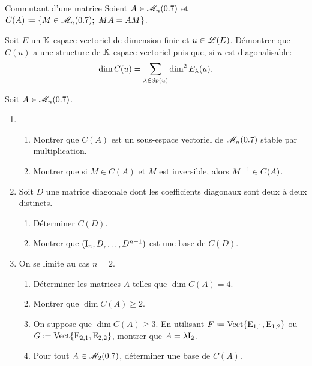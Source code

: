 \begin{defi}{Commutant d'une matrice}
    Soient $A \in \mathscr{M}_n(0.7)$ et $C(A) \defeq \{ M \in \M_n(\R);\ MA = AM \}$.
\end{defi}

\begin{exercice}
    Soit $E$ un $\mathbb{K}$-espace vectoriel de dimension finie et $u \in \mathscr{L}(E)$. Démontrer que $C(u)$ a une structure de $\mathbb{K}$-espace vectoriel puis que, si $u$ est diagonalisable:
    $$\dim C(u) = \sum_{\lambda \in \mathrm{Sp}(u)} \dim^2 E_\lambda(u).$$
\end{exercice}

\begin{solution}
    
\end{solution}

\begin{exercice}
    Soit $A \in \mathscr{M}_n(0.7)$.
    \begin{enumerate}
        \item 
        \begin{enumerate}
            \item Montrer que $C(A)$ est un sous-espace vectoriel de $\mathscr{M}_n(0.7)$ stable par multiplication.
            \item Montrer que si $M \in C(A)$ et $M$ est inversible, alors $M^{-1} \in C(A)$.
        \end{enumerate}
        \item Soit $D$ une matrice diagonale dont les coefficients diagonaux sont deux à deux distincts.
        \begin{enumerate}
            \item Déterminer $C(D)$.
            \item Montrer que $(\mathrm{I}_n, D, \dots, D^{n-1})$ est une base de $C(D)$.
        \end{enumerate}
        \item On se limite au cas $n=2$.
        \begin{enumerate}
            \item Déterminer les matrices $A$ telles que $\dim C(A) = 4$.
            \item Montrer que $\dim C(A) \geqslant 2$. 
            \item On suppose que $\dim C(A) \geqslant 3$. En utilisant $F \defeq \Vect \{ \mathrm{E}_{1, 1}, \mathrm{E}_{1, 2} \}$ ou $G \defeq \Vect \{ \mathrm{E}_{2, 1}, \mathrm{E}_{2, 2} \}$, montrer que $A = \lambda \mathrm{I}_2$.
            \item Pour tout $A \in \mathscr{M}_2(0.7)$, déterminer une base de $C(A)$.
        \end{enumerate}
    \end{enumerate}
\end{exercice}

